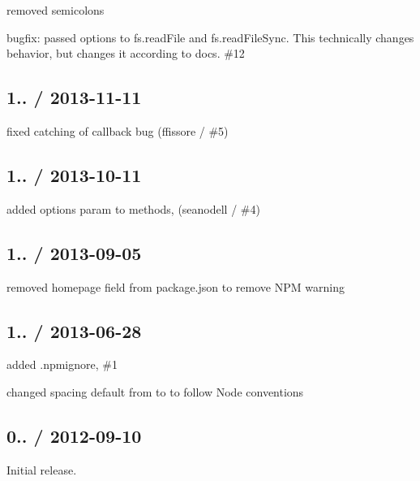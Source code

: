 \begin{DoxyItemize}
\item removed semicolons
\item bugfix\+: passed {\ttfamily options} to {\ttfamily fs.\+read\+File} and {\ttfamily fs.\+read\+File\+Sync}. This technically changes behavior, but changes it according to docs. \#12
\end{DoxyItemize}

\subsection*{1.. / 2013-\/11-\/11 }


\begin{DoxyItemize}
\item fixed catching of callback bug (ffissore / \#5)
\end{DoxyItemize}

\subsection*{1.. / 2013-\/10-\/11 }


\begin{DoxyItemize}
\item added {\ttfamily options} param to methods, (seanodell / \#4)
\end{DoxyItemize}

\subsection*{1.. / 2013-\/09-\/05 }


\begin{DoxyItemize}
\item removed {\ttfamily homepage} field from package.\+json to remove N\+P\+M warning
\end{DoxyItemize}

\subsection*{1.. / 2013-\/06-\/28 }


\begin{DoxyItemize}
\item added {\ttfamily .npmignore}, \#1
\item changed spacing default from {} to {} to follow Node conventions
\end{DoxyItemize}

\subsection*{0.. / 2012-\/09-\/10 }


\begin{DoxyItemize}
\item Initial release. 
\end{DoxyItemize}
